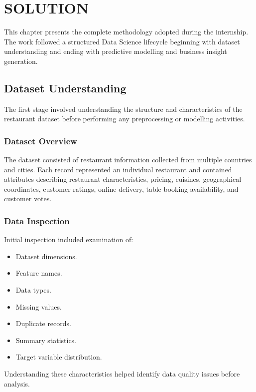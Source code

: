 \documentclass[12pt,a4paper]{report}
\begin{document}
\chapter{SOLUTION}

This chapter presents the complete methodology adopted during the internship. The work followed a structured Data Science lifecycle beginning with dataset understanding and ending with predictive modelling and business insight generation.

\section{Dataset Understanding}

The first stage involved understanding the structure and characteristics of the restaurant dataset before performing any preprocessing or modelling activities.

\subsection{Dataset Overview}

The dataset consisted of restaurant information collected from multiple countries and cities. Each record represented an individual restaurant and contained attributes describing restaurant characteristics, pricing, cuisines, geographical coordinates, customer ratings, online delivery, table booking availability, and customer votes.

\subsection{Data Inspection}

Initial inspection included examination of:

\begin{itemize}
\item Dataset dimensions.
\item Feature names.
\item Data types.
\item Missing values.
\item Duplicate records.
\item Summary statistics.
\item Target variable distribution.
\end{itemize}

Understanding these characteristics helped identify data quality issues before analysis.
\end{document}

